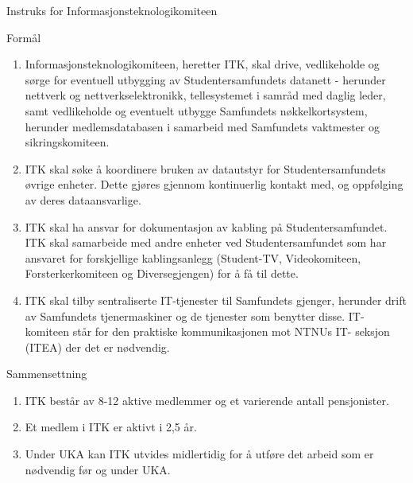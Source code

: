 
\begin{instruks}{Instruks for Informasjonsteknologikomiteen}{}{}

    \begin{instruksledd}{Formål}
        \begin{enumerate}
            \item Informasjonsteknologikomiteen, heretter ITK, skal drive, vedlikeholde og sørge for
                eventuell utbygging av
                Studentersamfundets datanett - herunder nettverk og nettverkselektronikk, tellesystemet i
                samråd med daglig
                leder, samt vedlikeholde og eventuelt utbygge Samfundets nøkkelkortsystem, herunder
                medlemsdatabasen i
                samarbeid med Samfundets vaktmester og sikringskomiteen.
            \item  ITK skal søke å koordinere bruken av datautstyr for Studentersamfundets øvrige
                enheter. Dette gjøres
                gjennom kontinuerlig kontakt med, og oppfølging av deres dataansvarlige.
            \item  ITK skal ha ansvar for dokumentasjon av kabling på Studentersamfundet. ITK skal
                samarbeide med andre
                enheter ved Studentersamfundet som har ansvaret for forskjellige kablingsanlegg
                (Student-TV, Videokomiteen, Forsterkerkomiteen og Diversegjengen) for å få til dette.
            \item  ITK skal tilby sentraliserte IT-tjenester til Samfundets gjenger, herunder drift av
                Samfundets tjenermaskiner
                og de tjenester som benytter disse. IT-komiteen står for den praktiske kommunikasjonen
                mot NTNUs IT-
                seksjon (ITEA) der det er nødvendig.
        \end{enumerate}
    \end{instruksledd}

    \begin{instruksledd}{Sammensettning}
        \begin{enumerate}
            \item ITK består av 8-12 aktive medlemmer og et varierende antall pensjonister.
            \item Et medlem i ITK er aktivt i 2,5 år.
            \item  Under UKA kan ITK utvides midlertidig for å utføre det arbeid som er nødvendig før og
            under UKA.
        \end{enumerate}
    \end{instruksledd}


\end{instruks}

